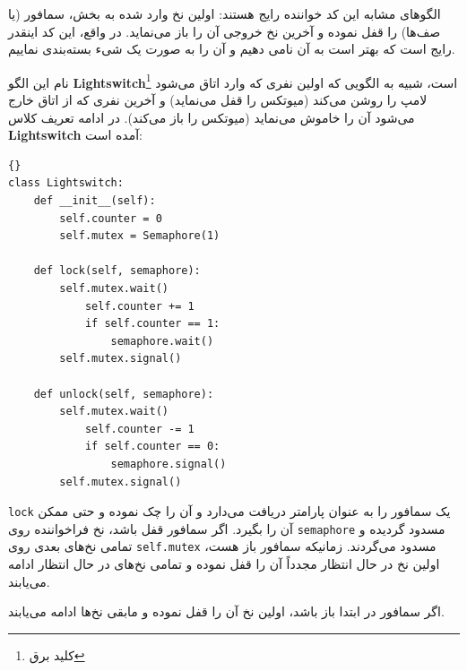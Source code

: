 \documentclass{book}
\begin{document}
    الگوهای مشابه این کد خواننده رایج هستند: اولین نخ وارد شده به بخش، سمافور (یا صف‌ها) را قفل نموده و آخرین نخ خروجی آن را باز می‌نماید. 
    در واقع، این کد اینقدر رایج است که بهتر است به آن نامی دهیم و آن را به صورت یک شیء بسته‌بندی نماییم. 
    
    نام این الگو {\bf Lightswitch}\footnote{کلید برق} است، شبیه به الگویی که اولین نفری که وارد اتاق می‌شود لامپ را روشن می‌کند  (میوتکس
    را قفل می‌نماید) و آخرین نفری که از اتاق خارج می‌شود آن را خاموش می‌نماید (میوتکس را باز می‌کند).
    در ادامه تعریف کلاس {\bf Lightswitch} آمده است: 
\begin{latin}
\begin{lstlisting}[title={\rl{تعریف} Lightswitch }]{}
class Lightswitch:
    def __init__(self):
        self.counter = 0
        self.mutex = Semaphore(1)

    def lock(self, semaphore):
        self.mutex.wait()
            self.counter += 1
            if self.counter == 1:
                semaphore.wait()
        self.mutex.signal()

    def unlock(self, semaphore):
        self.mutex.wait()
            self.counter -= 1
            if self.counter == 0:
                semaphore.signal()
        self.mutex.signal()
\end{lstlisting}
\end{latin}

    {\tt lock} 
    یک سمافور را به عنوان پارامتر دریافت می‌دارد و آن را چک نموده و حتی ممکن آن را بگیرد. 
    اگر سمافور قفل باشد، نخ فراخواننده روی  {\tt semaphore} مسدود گردیده و تمامی نخ‌های بعدی روی {\tt self.mutex} مسدود می‌گردند. 
    زمانیکه سمافور باز هست، اولین نخ در حال انتظار مجدداً  آن را قفل نموده و تمامی نخ‌های در حال انتظار ادامه می‌یابند. 

    اگر سمافور در ابتدا باز باشد، اولین نخ آن را قفل نموده و مابقی نخ‌ها ادامه می‌یابند. 
\end{document}
